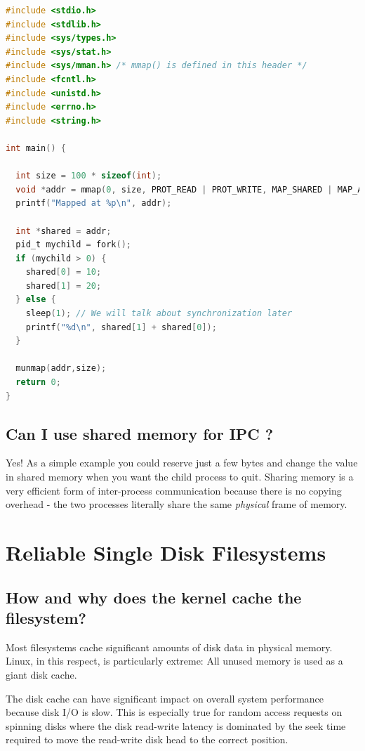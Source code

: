 \begin{lstlisting}[language=C]
#include <stdio.h>
#include <stdlib.h>
#include <sys/types.h>
#include <sys/stat.h>
#include <sys/mman.h> /* mmap() is defined in this header */
#include <fcntl.h>
#include <unistd.h>
#include <errno.h>
#include <string.h>

int main() {
  
  int size = 100 * sizeof(int);  
  void *addr = mmap(0, size, PROT_READ | PROT_WRITE, MAP_SHARED | MAP_ANONYMOUS, -1, 0);
  printf("Mapped at %p\n", addr);
  
  int *shared = addr;
  pid_t mychild = fork();
  if (mychild > 0) {
    shared[0] = 10;
    shared[1] = 20;
  } else {
    sleep(1); // We will talk about synchronization later
    printf("%d\n", shared[1] + shared[0]);
  }

  munmap(addr,size);
  return 0;
}
\end{lstlisting}

\subsection{Can I use shared memory for IPC ?}\label{can-i-use-shared-memory-for-ipc}

Yes! As a simple example you could reserve just a few bytes and change the value in shared memory when you want the child process to quit. Sharing memory is a very efficient form of inter-process communication because there is no copying overhead - the two processes literally share the same \emph{physical} frame of memory.

\section{Reliable Single Disk Filesystems}\label{reliable-single-disk-filesystems}

\subsection{How and why does the kernel cache the filesystem?}\label{how-and-why-does-the-kernel-cache-the-filesystem}

Most filesystems cache significant amounts of disk data in physical memory. Linux, in this respect, is particularly extreme: All unused memory is used as a giant disk cache.

The disk cache can have significant impact on overall system performance because disk I/O is slow. This is especially true for random access requests on spinning disks where the disk read-write latency is dominated by the seek time required to move the read-write disk head to the correct position.


